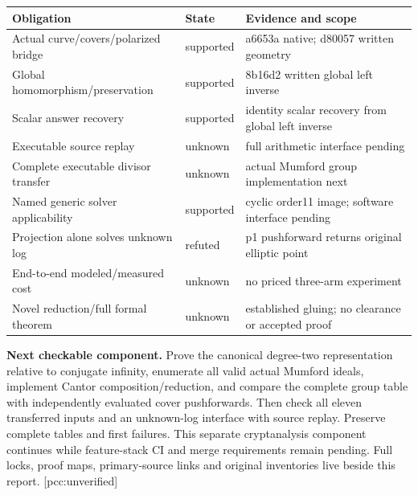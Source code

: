 \documentclass[10pt,a4paper]{article}
\begin{document}
\begin{center}\small
\begin{tabular}{p{57mm}p{24mm}p{71mm}}
\toprule
Obligation & State & Evidence and scope\\
\midrule
Actual curve/covers/polarized bridge & supported & a6653a native; d80057 written geometry\\
Global homomorphism/preservation & supported & 8b16d2 written global left inverse\\
Scalar answer recovery & supported & identity scalar recovery from global left inverse\\
Executable source replay & unknown & full arithmetic interface pending\\
Complete executable divisor transfer & unknown & actual Mumford group implementation next\\
Named generic solver applicability & supported & cyclic order11 image; software interface pending\\
Projection alone solves unknown log & refuted & p1 pushforward returns original elliptic point\\
End-to-end modeled/measured cost & unknown & no priced three-arm experiment\\
Novel reduction/full formal theorem & unknown & established gluing; no clearance or accepted proof\\
\bottomrule
\end{tabular}\end{center}

\textbf{Next checkable component.} Prove the canonical degree-two
representation relative to conjugate infinity, enumerate all valid actual
Mumford ideals, implement Cantor composition/reduction, and compare the
complete group table with independently evaluated cover pushforwards.
Then check all eleven transferred inputs and an unknown-log interface
with source replay. Preserve complete tables and first failures. This
separate cryptanalysis component continues while feature-stack CI and
merge requirements remain pending. Full locks, proof maps, primary-source
links and original inventories live beside this report. [pcc:unverified]
\end{document}
